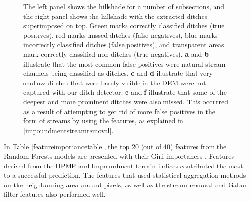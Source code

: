 \documentclass[11pt, review]{elsarticle} %
\begin{document}
\begin{figure} [!htb]
    \caption{The left panel shows the hillshade for a number of subsections, and the right panel shows the hillshade with the extracted ditches superimposed on top. Green marks correctly classified ditches (true positives), red marks missed ditches (false negatives), blue marks incorrectly classified ditches (false positives), and transparent areas mark correctly classified non-ditches (true negatives). \textbf{a} and \textbf{b} illustrate that the most common false positives were natural stream channels being classified as ditches. \textbf{c} and \textbf{d} illustrate that very shallow ditches that were barely visible in the DEM were not captured with our ditch detector. \textbf{e} and \textbf{f} illustrate that some of the deepest and more prominent ditches were also missed. This occurred as a result of attempting to get rid of more false positives in the form of streams by using the features, as explained in \ref{impoundmentstreamremoval}.}
    \label{fig:resultsillustrations}
\end{figure}
\clearpage

In \hyperref[featureimportancetable]{Table} \ref{featureimportancetable}, the top 20 (out of 40) features from the Random Forests models are presented with their Gini importances \citep{gini}. Features derived from the \hyperref[hpmf]{HPMF} and \hyperref[impoundment]{Impoundment} terrain indices contributed the most to a successful prediction. The features that used statistical aggregation methods on the neighbouring area around pixels, as well as the stream removal and Gabor filter features also performed well.
\end{document}
